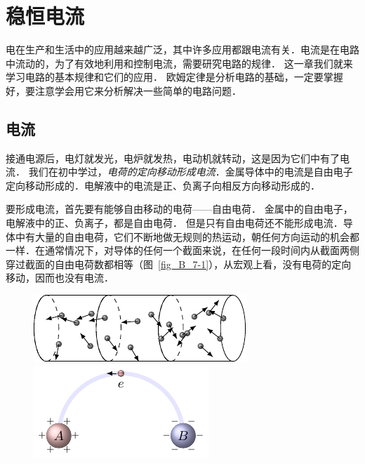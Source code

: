\chapter{稳恒电流}\label{chapter-steady-current}

电在生产和生活中的应用越来越广泛，其中许多应用都跟电流有关．电流是在电路中流动的，为了有效地利用和控制电流，需要研究电路的规律．
这一章我们就来学习电路的基本规律和它们的应用．
欧姆定律是分析电路的基础，一定要掌握好，要注意学会用它来分析解决一些简单的电路问题．

\section{电流}
接通电源后，电灯就发光，电炉就发热，电动机就转动，这是因为它们中有了电流．
我们在初中学过，\textit{电荷的定向移动形成电流}．金属导体中的电流是自由电子定向移动形成的．电解液中的电流是正、负离子向相反方向移动形成的．

要形成电流，首先要有能够自由移动的电荷——自由电荷．
金属中的自由电子，电解液中的正、负离子，都是自由电荷．
但是只有自由电荷还不能形成电流．导体中有大量的自由电荷，它们不断地做无规则的热运动，朝任何方向运动的机会都一样．在通常情况下，对导体的任何一个截面来说，在任何一段时间内从截面两侧穿过截面的自由电荷数都相等（图~\ref{fig_B_7-1}），从宏观上看，没有电荷的定向移动，因而也没有电流．
\begin{figure}[htbp]
    \centering
    \begin{minipage}[t]{0.48\linewidth}
    	\centering
    	\includegraphics{fig/B/7-1.pdf}
    	\caption{}\label{fig_B_7-1}
    \end{minipage}
   \begin{minipage}[t]{0.48\linewidth}
   		\centering
   		\includegraphics{fig/B/7-2.pdf}
   		\caption{}\label{fig_B_7-2}
   \end{minipage}
\end{figure}

